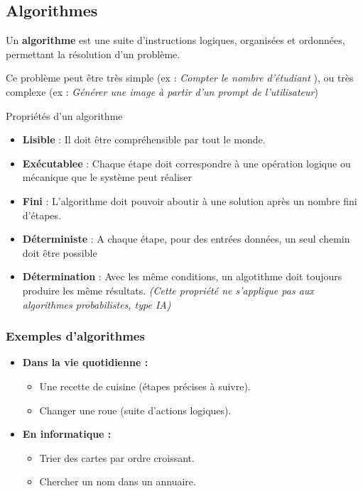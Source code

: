 \subsection{Algorithmes}

Un \textbf{algorithme} est une suite d’instructions logiques, organisées et ordonnées, permettant la résolution d'un problème.

Ce problème peut être très simple (ex : \textit{Compter le nombre d'étudiant} ), ou très complexe (ex : \textit{Générer une image à partir d'un prompt de l'utilisateur})

\begin{UPSTIinfor}{Propriétés d’un algorithme}
	\begin{itemize}
		\item \textbf{Lisible} : Il doit être compréhensible par tout le monde.
		\item \textbf{Exécutablee} : Chaque étape doit correspondre à une opération logique ou mécanique que le système peut réaliser
		\item \textbf{Fini} : L'algorithme doit pouvoir aboutir à une solution après un nombre fini d'étapes.
		\item \textbf{Déterministe} : A chaque étape, pour des entrées données, un seul chemin doit être possible
		\item \textbf{Détermination} : Avec les même conditions, un algotithme doit toujours produire les même résultats. \textit{(Cette propriété ne s'applique pas aux algorithmes probabilistes, type IA)}
	\end{itemize}
\end{UPSTIinfor}

\subsubsection{Exemples d’algorithmes}

\begin{itemize}
	\item \textbf{Dans la vie quotidienne :}
	      \begin{itemize}
		      \item Une recette de cuisine (étapes précises à suivre).
		      \item Changer une roue (suite d’actions logiques).
	      \end{itemize}
\end{itemize}

\begin{itemize}
	\item \textbf{En informatique :}
	      \begin{itemize}
		      \item Trier des cartes par ordre croissant.
		      \item Chercher un nom dans un annuaire.
	      \end{itemize}
\end{itemize}

